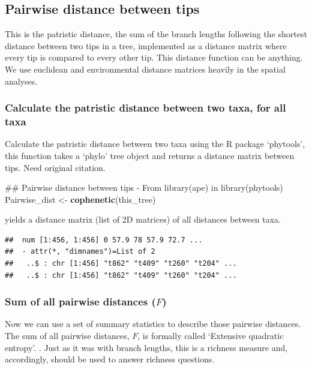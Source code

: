 \documentclass[]{book}
\newenvironment{Shaded}{\begin{snugshade}}{\end{snugshade}}
\newcommand{\KeywordTok}[1]{\textcolor[rgb]{0.13,0.29,0.53}{\textbf{{#1}}}}
\newcommand{\StringTok}[1]{\textcolor[rgb]{0.31,0.60,0.02}{{#1}}}
\newcommand{\NormalTok}[1]{{#1}}
\theoremstyle{definition}
\theoremstyle{definition}
\theoremstyle{remark}
\begin{document}
\hypertarget{pairwise-distance-between-tips}{\subsection{Pairwise
distance between tips}\label{pairwise-distance-between-tips}}

This is the patristic distance, the sum of the branch lengths following
the shortest distance between two tips in a tree, implemented as a
distance matrix where every tip is compared to every other tip. This
distance function can be anything. We use euclidean and environmental
distance matrices heavily in the spatial analyses.

\subsubsection{Calculate the patristic distance between two taxa, for
all
taxa}\label{calculate-the-patristic-distance-between-two-taxa-for-all-taxa}

Calculate the patristic distance between two taxa using the R package
`phytools', this function takes a `phylo' tree object and returns a
distance matrix between tips. Need original citation.

\begin{Shaded}
\begin{Highlighting}[]
\NormalTok{## Pairwise distance between tips - From library(ape) in library(phytools)}
\NormalTok{Pairwise_dist <-}\StringTok{ }\KeywordTok{cophenetic}\NormalTok{(this_tree)}
\end{Highlighting}
\end{Shaded}

yields a distance matrix (list of 2D matrices) of all distances between
taxa.

\begin{verbatim}
##  num [1:456, 1:456] 0 57.9 78 57.9 72.7 ...
##  - attr(*, "dimnames")=List of 2
##   ..$ : chr [1:456] "t862" "t409" "t260" "t204" ...
##   ..$ : chr [1:456] "t862" "t409" "t260" "t204" ...
\end{verbatim}

\subsubsection{\texorpdfstring{Sum of all pairwise distances
(\(F\))}{Sum of all pairwise distances (F)}}\label{sum-of-all-pairwise-distances-f}

Now we can use a set of summary statistics to describe those pairwise
distances. The sum of all pairwise distances, \(F\), is formally called
`Extensive quadratic entropy'. \citep{Izsak2000}. Just as it was with
branch lengths, this is a richness measure and, accordingly, should be
used to answer richness questions.
\end{document}
